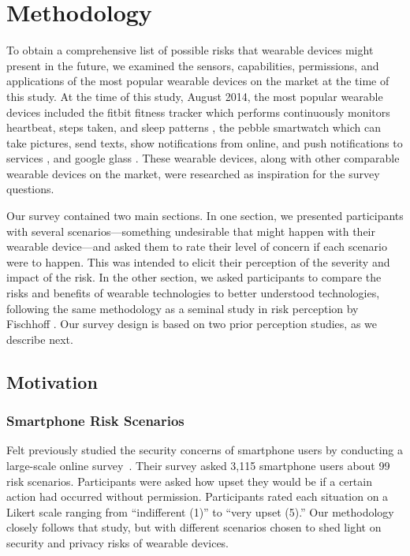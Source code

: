 
\section{Methodology}
To obtain a comprehensive list of possible risks that wearable devices might present in the future, we examined the sensors, capabilities, permissions, and applications of the most popular wearable devices on the market at the time of this study. At the time of this study, August 2014, the most popular wearable devices included the fitbit fitness tracker which performs continuously monitors heartbeat, steps taken, and sleep patterns \cite{6_fitbit_2014, 7_time_2014}, the pebble smartwatch which can take pictures, send texts, show notifications from online, and push notifications to services \cite{pebble_smartwatch_2014, 9_verge_2014, 10_readwrite_2014}, and google glass \cite{11_wikipedia_2015, 12_turi_2014}. These wearable devices, along with other comparable wearable devices on the market, were researched as inspiration for the survey questions. 

Our survey contained two main sections.
In one section, we presented participants with several scenarios---something undesirable that might happen with their wearable device---and asked them to rate their level of concern if each scenario were to happen.
This was intended to elicit their perception of the severity and impact of the risk.
In the other section, we asked participants to compare the risks and benefits of wearable technologies to better understood technologies, following the same methodology as a seminal study in risk perception by Fischhoff \etal \cite{Fischhoff}.
Our survey design is based on two prior perception studies, as we describe next.

\subsection{Motivation}
\subsubsection{Smartphone Risk Scenarios}
Felt \etal previously studied the security concerns of smartphone users by conducting a large-scale online survey~\cite{Felt}. Their survey asked 3,115 smartphone users about 99 risk scenarios. Participants were asked how upset they would be if a certain action had occurred without permission. Participants rated each situation on a Likert scale ranging from ``indifferent (1)'' to ``very upset (5).''
Our methodology closely follows that study, but with different scenarios chosen to shed light on security and privacy risks of wearable devices.

